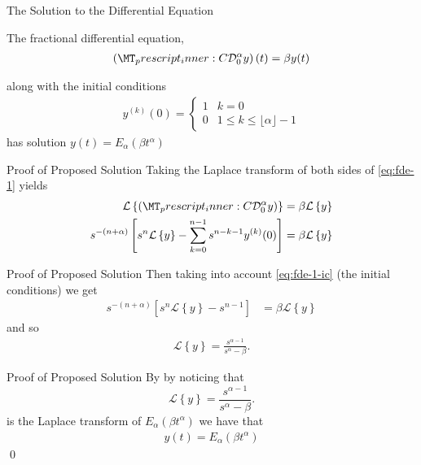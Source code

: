\documentclass[pdf]{beamer}
\newcommand{\laplace}[1]{ \mathcal{L} \left\{ #1 \right\} }
\newcommand{\capder}[3]{ \left( \prescript{C}{}{\mathcal{D}_{#1}^{#2}} #3 \right) }
\begin{document}
\begin{frame}{The Solution to the Differential Equation}
	\begin{lemma}
		The fractional differential equation,
		\begin{align}
			\label{eq:fde-1}
			\left( \prescript{C}{}{\mathcal{D}_0^\alpha}y \right)(t) = \beta y(t) 
		\end{align}

		along with the initial conditions 
		\begin{align}
			\label{eq:fde-1-ic}
			y^{(k)}(0) = 
			\begin{cases}
				1 & k = 0 \\
				0 & 1 \leq k \leq \lfloor \alpha \rfloor - 1  
			\end{cases}
		\end{align}
		has solution
		$ y(t) = E_\alpha \left( \beta t^\alpha \right) $
	\end{lemma}
\end{frame}

\begin{frame}{Proof of Proposed Solution}
	Taking the Laplace transform of both sides of \eqref{eq:fde-1} yields
	\begin{align*}
		\laplace{\capder{0}{\alpha}{y}} &= \beta \laplace{y} \\
		s^{-(n+\alpha)} \left[s^n \laplace{y} - \sum_{k=0}^{n-1} s^{n-k-1} y^{(k)}(0) \right] &= \beta \laplace{y}
	\end{align*}
\end{frame}

\begin{frame}{Proof of Proposed Solution}
	Then taking into account \eqref{eq:fde-1-ic} (the initial conditions) we get
	\begin{align*}
		s^{-(n+\alpha)} \left[s^n \laplace{y} - s^{n-1}\right] &= \beta \laplace{y}
	\end{align*}
	and so 
	\begin{align*}
		\laplace{y} = \frac{s^{\alpha-1}}{s^\alpha - \beta}.
	\end{align*}
\end{frame}

\begin{frame}{Proof of Proposed Solution}
	By by noticing that 
	$$
		\laplace{y} = \frac{s^{\alpha-1}}{s^\alpha - \beta}.
	$$
	is the Laplace transform of $ E_\alpha(\beta t^\alpha) $ we have that
	\begin{align*}
		y(t) = E_\alpha(\beta t^\alpha)
	\end{align*}
	\qed
\end{frame}


	
\end{document}
